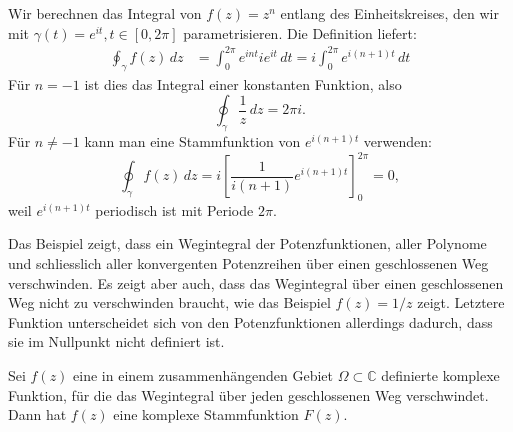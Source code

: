 \begin{beispiel}
Wir berechnen das Integral von $f(z)=z^n$ entlang des Einheitskreises,
den wir mit $\gamma(t)=e^{it},t\in[0,2\pi]$ parametrisieren.
Die Definition liefert:
\begin{align*}
\oint_{\gamma}f(z)\,dz
&=
\int_0^{2\pi}e^{int}ie^{it}\,dt
=
i\int_0^{2\pi}e^{i(n+1)t}\,dt
\end{align*}
Für $n=-1$ ist dies das Integral einer konstanten Funktion, also
\[
\oint_{\gamma}\frac1z\,dz=2\pi i.
\]
Für $n\ne -1$ kann man eine Stammfunktion von $e^{i(n+1)t}$
verwenden:
\[
\oint_{\gamma}f(z)\,dz
=
i\left[\frac1{i(n+1)}e^{i(n+1)t}\right]_0^{2\pi}
=0,
\]
weil $e^{i(n+1)t}$ periodisch ist mit Periode $2\pi$.
\end{beispiel}
Das Beispiel zeigt, dass ein Wegintegral der Potenzfunktionen,
aller Polynome und schliesslich aller konvergenten Potenzreihen
über einen geschlossenen Weg verschwinden.
Es zeigt aber auch, dass das Wegintegral über einen geschlossenen
Weg nicht zu verschwinden braucht, wie das Beispiel $f(z)=1/z$
zeigt.
Letztere Funktion unterscheidet sich von den Potenzfunktionen allerdings
dadurch, dass sie im Nullpunkt nicht definiert ist.

\begin{satz}
Sei $f(z)$ eine in einem zusammenhängenden Gebiet $\Omega\subset\mathbb C$
definierte komplexe Funktion, für die das Wegintegral über jeden
geschlossenen Weg verschwindet.
Dann hat $f(z)$ eine komplexe Stammfunktion $F(z)$.
\end{satz}

